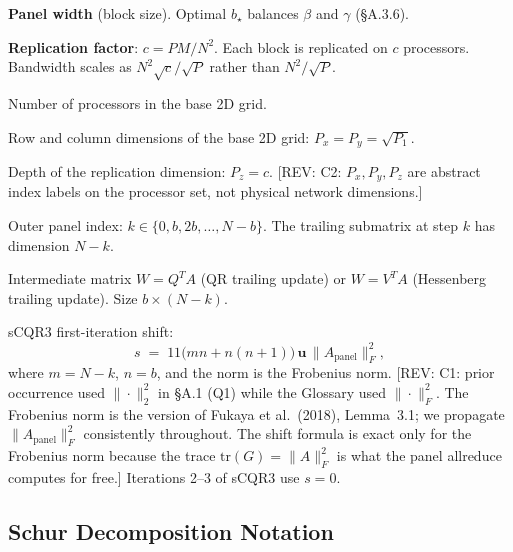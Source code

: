 \documentclass[11pt]{article}
\newcommand{\REV}[1]{\textcolor{blue!60!black}{\small\textsf{[REV: #1]}}}
\begin{document}
\begin{description}[leftmargin=3.5em, labelwidth=3em, labelsep=0.5em,
                    style=nextline, font=\normalfont\itshape]

\item[$b$] \textbf{Panel width} (block size). Optimal $b_\star$ balances
  $\beta$ and $\gamma$ (\S A.3.6).

\item[$c$] \textbf{Replication factor}: $c = PM/N^2$. Each block is
  replicated on $c$ processors. Bandwidth scales as $N^2 \sqrt{c}/\sqrt{P}$
  rather than $N^2/\sqrt{P}$.

\item[$P_1 = P/c$] Number of processors in the base 2D grid.
\item[$P_x,\, P_y$] Row and column dimensions of the base 2D grid:
  $P_x = P_y = \sqrt{P_1}$.
\item[$P_z$] Depth of the replication dimension: $P_z = c$.
  \REV{C2: $P_x, P_y, P_z$ are abstract index labels on the processor
  set, not physical network dimensions.}

\item[$k$] Outer panel index: $k \in \{0, b, 2b, \ldots, N-b\}$. The
  trailing submatrix at step $k$ has dimension $N-k$.

\item[$W$] Intermediate matrix $W = Q^T A$ (QR trailing update) or
  $W = V^T A$ (Hessenberg trailing update). Size $b \times (N-k)$.

\item[$s$] sCQR3 first-iteration shift:
  \[
    s \;=\; 11\big(mn + n(n{+}1)\big)\,\mathbf{u}\,\|A_{\mathrm{panel}}\|_F^2,
  \]
  where $m = N - k$, $n = b$, and the norm is the Frobenius norm.
  \REV{C1: prior occurrence used $\|\cdot\|_2^2$ in \S A.1 (Q1) while the
  Glossary used $\|\cdot\|_F^2$. The Frobenius norm is the version of
  Fukaya et al.\ (2018), Lemma~3.1; we propagate $\|A_{\mathrm{panel}}\|_F^2$
  consistently throughout. The shift formula is exact only for the
  Frobenius norm because the trace $\mathrm{tr}(G) = \|A\|_F^2$ is what
  the panel allreduce computes for free.}
  Iterations 2--3 of sCQR3 use $s = 0$.

\end{description}

\subsection*{Schur Decomposition Notation}
\end{document}
